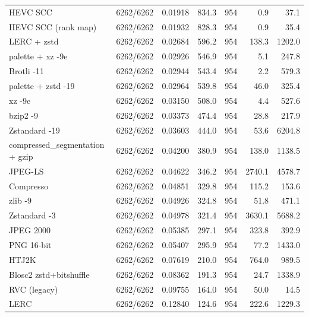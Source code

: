 \begin{table}[t]
\begin{tabular}{lrrrrrr}
HEVC SCC & 6262/6262 & 0.01918 & 834.3 & 954 & 0.9 & 37.1 \\
HEVC SCC (rank map) & 6262/6262 & 0.01932 & 828.3 & 954 & 0.9 & 35.4 \\
LERC + zstd & 6262/6262 & 0.02684 & 596.2 & 954 & 138.3 & 1202.0 \\
palette + xz -9e & 6262/6262 & 0.02926 & 546.9 & 954 & 5.1 & 247.8 \\
Brotli -11 & 6262/6262 & 0.02944 & 543.4 & 954 & 2.2 & 579.3 \\
palette + zstd -19 & 6262/6262 & 0.02964 & 539.8 & 954 & 46.0 & 325.4 \\
xz -9e & 6262/6262 & 0.03150 & 508.0 & 954 & 4.4 & 527.6 \\
bzip2 -9 & 6262/6262 & 0.03373 & 474.4 & 954 & 28.8 & 217.9 \\
Zstandard -19 & 6262/6262 & 0.03603 & 444.0 & 954 & 53.6 & 6204.8 \\
compressed\_segmentation + gzip & 6262/6262 & 0.04200 & 380.9 & 954 & 138.0 & 1138.5 \\
JPEG-LS & 6262/6262 & 0.04622 & 346.2 & 954 & 2740.1 & 4578.7 \\
Compresso & 6262/6262 & 0.04851 & 329.8 & 954 & 115.2 & 153.6 \\
zlib -9 & 6262/6262 & 0.04926 & 324.8 & 954 & 51.8 & 471.1 \\
Zstandard -3 & 6262/6262 & 0.04978 & 321.4 & 954 & 3630.1 & 5688.2 \\
JPEG 2000 & 6262/6262 & 0.05385 & 297.1 & 954 & 323.8 & 392.9 \\
PNG 16-bit & 6262/6262 & 0.05407 & 295.9 & 954 & 77.2 & 1433.0 \\
HTJ2K & 6262/6262 & 0.07619 & 210.0 & 954 & 764.0 & 989.5 \\
Blosc2 zstd+bitshuffle & 6262/6262 & 0.08362 & 191.3 & 954 & 24.7 & 1338.9 \\
RVC (legacy) & 6262/6262 & 0.09755 & 164.0 & 954 & 50.0 & 14.5 \\
LERC & 6262/6262 & 0.12840 & 124.6 & 954 & 222.6 & 1229.3 \\
\hline
\end{tabular}
\end{table}
